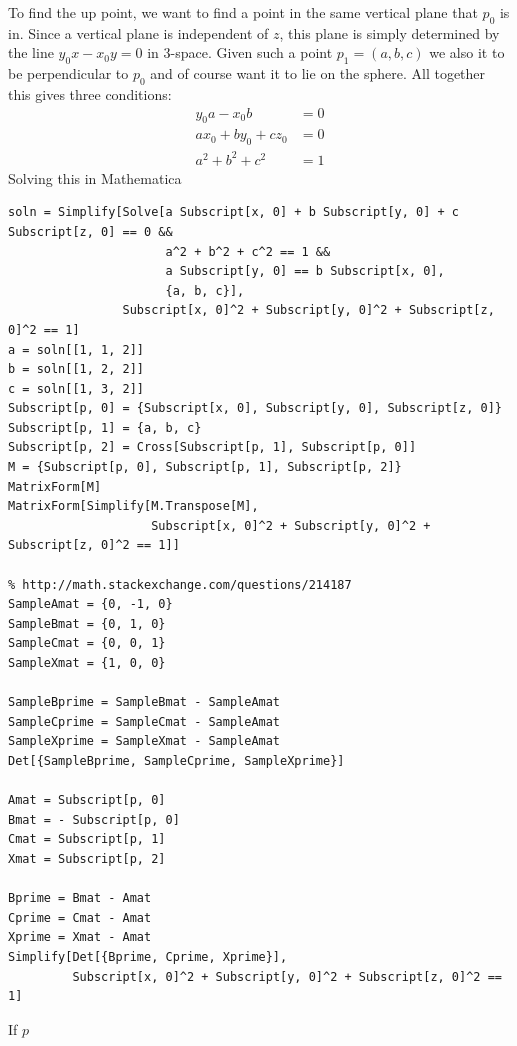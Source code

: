 \documentclass[a4paper,10pt]{article}
\begin{document}
To find the up point, we want to find a point in the same vertical plane
that \(p_0\) is in. Since a vertical plane is independent of \(z\), this
plane is simply determined by the line \(y_0 x - x_0 y = 0\) in \(3\)-space.
Given such a point \(p_1 = (a, b, c)\) we also it to be perpendicular to
\(p_0\) and of course want it to lie on the sphere. All together this
gives three conditions:
\begin{align*}
y_0 a - x_0 b &= 0 \\
a x_0 + b y_0 + c z_0 &= 0 \\
a^2 + b^2 + c^2 &= 1
\end{align*}
Solving this in Mathematica
\begin{verbatim}
soln = Simplify[Solve[a Subscript[x, 0] + b Subscript[y, 0] + c Subscript[z, 0] == 0 &&
                      a^2 + b^2 + c^2 == 1 &&
                      a Subscript[y, 0] == b Subscript[x, 0],
                      {a, b, c}],
                Subscript[x, 0]^2 + Subscript[y, 0]^2 + Subscript[z, 0]^2 == 1]
a = soln[[1, 1, 2]]
b = soln[[1, 2, 2]]
c = soln[[1, 3, 2]]
Subscript[p, 0] = {Subscript[x, 0], Subscript[y, 0], Subscript[z, 0]}
Subscript[p, 1] = {a, b, c}
Subscript[p, 2] = Cross[Subscript[p, 1], Subscript[p, 0]]
M = {Subscript[p, 0], Subscript[p, 1], Subscript[p, 2]}
MatrixForm[M]
MatrixForm[Simplify[M.Transpose[M],
                    Subscript[x, 0]^2 + Subscript[y, 0]^2 + Subscript[z, 0]^2 == 1]]

% http://math.stackexchange.com/questions/214187
SampleAmat = {0, -1, 0}
SampleBmat = {0, 1, 0}
SampleCmat = {0, 0, 1}
SampleXmat = {1, 0, 0}

SampleBprime = SampleBmat - SampleAmat
SampleCprime = SampleCmat - SampleAmat
SampleXprime = SampleXmat - SampleAmat
Det[{SampleBprime, SampleCprime, SampleXprime}]

Amat = Subscript[p, 0]
Bmat = - Subscript[p, 0]
Cmat = Subscript[p, 1]
Xmat = Subscript[p, 2]

Bprime = Bmat - Amat
Cprime = Cmat - Amat
Xprime = Xmat - Amat
Simplify[Det[{Bprime, Cprime, Xprime}],
         Subscript[x, 0]^2 + Subscript[y, 0]^2 + Subscript[z, 0]^2 == 1]
\end{verbatim}

If \(p\)
\end{document}
